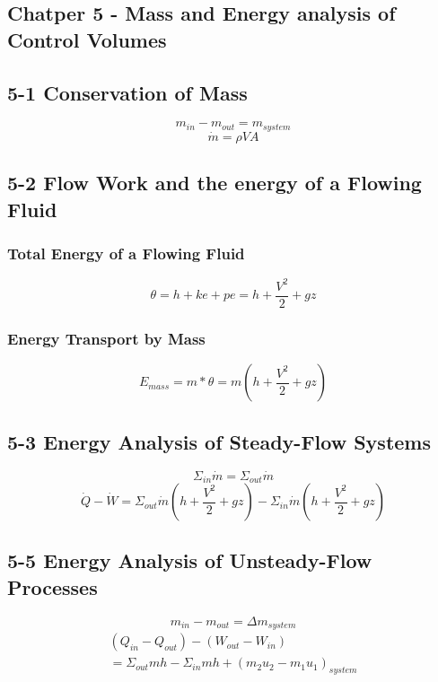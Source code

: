 \documentclass[10pt,landscape]{article}
\begin{document}
\begin{multicols}{3}
\section{Chatper 5 - Mass and Energy analysis of Control Volumes}
\subsection{5-1 Conservation of Mass}
\begin{equation}
    m_{in}-m_{out}=m_{system}
\end{equation}
\begin{equation}
    \dot{m}=\rho VA
\end{equation}
\subsection{5-2 Flow Work and the energy of a Flowing Fluid}
\subsubsection{Total Energy of a Flowing Fluid}
\begin{equation}
    \theta=h+ke+pe=h+\frac{V^2}{2}+gz
\end{equation}
\subsubsection{Energy Transport by Mass}
\begin{equation}
    E_{mass}=m*\theta=m(h+\frac{V^2}{2}+gz)
\end{equation}
\subsection{5-3 Energy Analysis of Steady-Flow Systems}
\begin{equation}
    \Sigma_{in}\dot{m}=\Sigma_{out}\dot{m}
\end{equation}
\begin{equation}
    \dot{Q}-\dot{W}=\Sigma_{out}\dot{m}(h+\frac{V^2}{2}+gz)-\Sigma_{in}\dot{m}(h+\frac{V^2}{2}+gz)
\end{equation}
\subsection{5-5 Energy Analysis of Unsteady-Flow Processes}
\begin{equation}
    m_{in}-m_{out}=\Delta m_{system}
\end{equation}
\begin{equation}
    \begin{split}
        (Q_{in}-Q_{out})-(W_{out}-W_{in})\\
        =\Sigma_{out}mh-\Sigma_{in}mh+(m_2u_2-m_1u_1)_{system}
    \end{split}
\end{equation}


\end{multicols}
\end{document}

